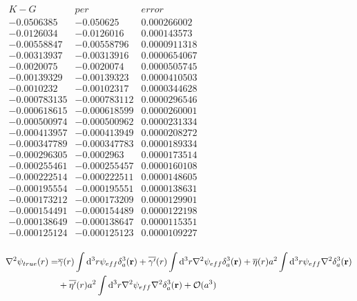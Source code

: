 \documentclass{article}
\begin{document}
$
\begin{array}{|ccc|}
 K-G & per & error \\
 -0.0506385 & -0.050625 & 0.000266002 \\
 -0.0126034 & -0.0126016 & 0.000143573 \\
 -0.00558847 & -0.00558796 & 0.0000911318 \\
 -0.00313937 & -0.00313916 & 0.0000654067 \\
 -0.0020075 & -0.0020074 & 0.0000505745 \\
 -0.00139329 & -0.00139323 & 0.0000410503 \\
 -0.0010232 & -0.00102317 & 0.0000344628 \\
 -0.000783135 & -0.000783112 & 0.0000296546 \\
 -0.000618615 & -0.000618599 & 0.0000260001 \\
 -0.000500974 & -0.000500962 & 0.0000231334 \\
 -0.000413957 & -0.000413949 & 0.0000208272 \\
 -0.000347789 & -0.000347783 & 0.0000189334 \\
 -0.000296305 & -0.0002963 & 0.0000173514 \\
 -0.000255461 & -0.000255457 & 0.0000160108 \\
 -0.000222514 & -0.000222511 & 0.0000148605 \\
 -0.000195554 & -0.000195551 & 0.0000138631 \\
 -0.000173212 & -0.000173209 & 0.0000129901 \\
 -0.000154491 & -0.000154489 & 0.0000122198 \\
 -0.000138649 & -0.000138647 & 0.0000115351 \\
 -0.000125124 & -0.000125123 & 0.0000109227 \\
\end{array}$

\begin{alignat}{1}\label{psi0rl}
  \laplacian{\psi_{true}(r)}=&\overline{\gamma}(r)\int\dd^3r\psi_{eff}\delta^3_a(\vb{r})+\overline{\gamma'}(r)\int\dd^3r\laplacian{\psi_{eff}\delta^3_a(\vb{r})}+\overline{\eta}(r)a^2\int\dd^3r\psi_{eff}\laplacian{\delta^3_a(\vb{r})}
 \nonumber\\&+\overline{\eta'}(r)a^2\int\dd^3r\laplacian{\psi_{eff}\laplacian{\delta^3_a(\vb{r})}}+\mathcal{O}(a^3)
\end{alignat}
\end{document}
